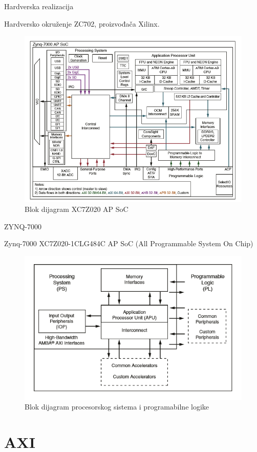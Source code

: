 \documentclass[10pt]{beamer}
\begin{document}
\begin{frame}{Hardverska realizacija}
	
	Hardversko okruženje ZC702, proizvođača Xilinx.
	
	\bigskip
		
	\begin{figure}[htb]
		\centering
		\includegraphics[width=.6\textwidth]{images/ZYNQ7000BD.png}
		\caption{Blok dijagram XC7Z020 AP SoC}
		\label{fig:zynq}
	\end{figure}	
		
	
\end{frame}

\begin{frame}{ZYNQ-7000}
	
	Zynq-7000 XC7Z020-1CLG484C AP SoC (All Programmable System On Chip)
	
	\bigskip
	
	\begin{figure}[htb]
		\centering
		\includegraphics[width=.7\textwidth]{images/PSZYNQ7000.png}
		\caption{Blok dijagram procesorskog sistema i programabilne logike}
		\label{fig:procSysProgLog}
	\end{figure}
	
\end{frame}

\section{AXI}
\end{document}

